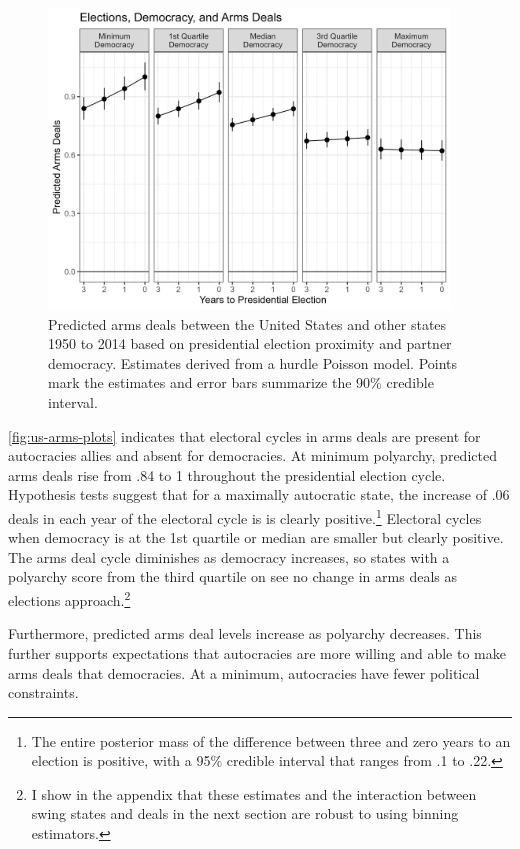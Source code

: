 \documentclass[12pt]{article}
\begin{document}
\begin{figure}[htpb]
	\centering
		\includegraphics[width=0.95\textwidth]{../figures/democ-deals-pred.png}
	\caption{Predicted arms deals between the United States and other states 1950 to 2014 based on presidential election proximity and partner democracy. Estimates derived from a hurdle Poisson model. Points mark the estimates and error bars summarize the 90\% credible interval.}
	\label{fig:democ-deals-pred}
\end{figure}


\autoref{fig:us-arms-plots} indicates that electoral cycles in arms deals are present for autocracies allies and absent for democracies.
At minimum polyarchy, predicted arms deals rise from .84 to 1 throughout the presidential election cycle.
Hypothesis tests suggest that for a maximally autocratic state, the increase of .06 deals in each year of the electoral cycle is is clearly positive.\footnote{The entire posterior mass of the difference between three and zero years to an election is positive, with a 95\% credible interval that ranges from .1 to .22.}
Electoral cycles when democracy is at the 1st quartile or median are smaller but clearly positive.
The arms deal cycle diminishes as democracy increases, so states with a polyarchy score from the third quartile on see no change in arms deals as elections approach.\footnote{I show in the appendix that these estimates and the interaction between swing states and deals in the next section are robust to using binning estimators.}  


Furthermore, predicted arms deal levels increase as polyarchy decreases. 
This further supports expectations that autocracies are more willing and able to make arms deals that democracies. 
At a minimum, autocracies have fewer political constraints. 
\end{document}
